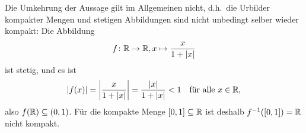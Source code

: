 \documentclass[a4paper,10pt]{article}
\begin{document}
\begin{bem}
 Die Umkehrung der Aussage gilt im Allgemeinen nicht, d.h.\ die Urbilder kompakter Mengen und stetigen Abbildungen sind nicht unbedingt selber wieder kompakt: Die Abbildung
 \[
  f \colon \mathbb{R} \to \mathbb{R}, x \mapsto \frac{x}{1+|x|}
 \]
 ist stetig, und es ist
 \[
  |f(x)|
  = \left| \frac{x}{1+|x|} \right|
  = \frac{|x|}{1+|x|}
  < 1
  \quad
  \text{für alle $x \in \mathbb{R}$},
 \]
 also $f(\mathbb{R}) \subseteq (0,1)$. Für die kompakte Menge $[0,1] \subseteq \mathbb{R}$ ist deshalb $f^{-1}([0,1]) = \mathbb{R}$ nicht kompakt.
\end{bem}
\end{document}
